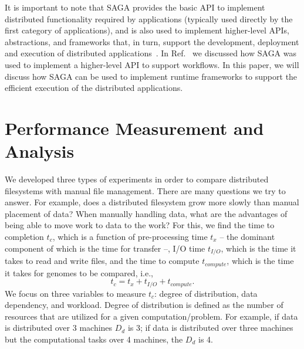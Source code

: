 \documentclass{rspublic}
\begin{document}

It is important to note that SAGA provides the basic API to implement
distributed functionality required by applications (typically used
directly by the first category of applications), and is also used to
implement higher-level APIs, abstractions, and frameworks that, in
turn, support the development, deployment and execution of distributed
applications~\cite{saga_gmac09}. In Ref.~\cite{saga_montage_escience09} we
discussed how SAGA was used to implement a higher-level API to support
workflows. In this paper, we will discuss how SAGA can be used to
implement runtime frameworks to support the efficient execution of the
distributed applications.


\section{Performance Measurement and Analysis} We developed three types
of experiments in order to compare distributed filesystems with manual
file management. There are many questions we try to answer.  For
example, does a distributed filesystem grow more slowly than manual
placement of data?  When manually handling data, what are the advantages
of being able to move work to data to the work? For this, we find the
time to completion $t_c$, which is a function of pre-processing time
$t_x$ -- the dominant component of which is the time for transfer --,
I/O time $t_{I/O}$, which is the time it takes to read and write files,
and the time to compute $t_{compute}$, which is the time it takes for
genomes to be compared, i.e.,
 \begin{equation}
t_c = t_x + t_{I/O} + t_{compute}.
\end{equation}
We focus on three variables to measure $t_c$: degree of distribution,
data dependency, and workload. Degree of distribution is defined as
the number of resources that are utilized for a given
computation/problem. For example, if data is distributed over 3
machines $D_d$ is 3; if data is distributed over three machines but
the computational tasks over 4 machines, the $D_d$ is 4.
\end{document}
